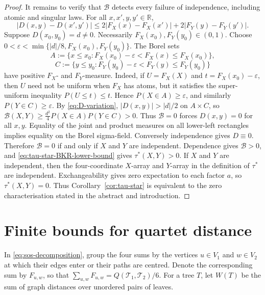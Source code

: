 \documentclass[12pt]{article}
\begin{document}
\begin{proof}
It remains to verify that $\mathcal B$ detects every failure of
independence, including atomic and singular laws.  For all
$x,x',y,y'\in\mathbb R$,
\begin{equation}\label{eq:D-variation}
|D(x,y)-D(x',y')|
\le2|F_X(x)-F_X(x')|+2|F_Y(y)-F_Y(y')|.
\end{equation}
Suppose $D(x_0,y_0)=d\ne0$.  Necessarily
$F_X(x_0),F_Y(y_0)\in(0,1)$.  Choose
$0<\varepsilon<\min\{|d|/8,\allowbreak F_X(x_0),\allowbreak F_Y(y_0)\}$.
The Borel sets
\begin{equation}\label{eq:display-099}
A:=\{x\le x_0:F_X(x_0)-\varepsilon<F_X(x)\le F_X(x_0)\},
\end{equation}
\begin{equation}\label{eq:display-100}
C:=\{y\le y_0:F_Y(y_0)-\varepsilon<F_Y(y)\le F_Y(y_0)\}
\end{equation}
have positive $F_X$- and $F_Y$-measure.  Indeed, if
$U=F_X(X)$ and $t=F_X(x_0)-\varepsilon$, then $U$ need not be uniform when
$F_X$ has atoms, but it satisfies the super-uniform inequality
$P(U\le t)\le t$.  Hence
$P(X\in A)\ge\varepsilon$, and similarly $P(Y\in C)\ge\varepsilon$.
By \eqref{eq:D-variation}, $|D(x,y)|>|d|/2$ on $A\times C$, so
$\mathcal B(X,Y)\ge\frac{d^2}{4}P(X\in A)P(Y\in C)>0$.
Thus $\mathcal B=0$ forces $D(x,y)=0$ for all $x,y$.  Equality of the
joint and product measures on all lower-left rectangles implies equality
on the Borel sigma-field.  Conversely independence gives $D\equiv0$.
Therefore $\mathcal B=0$ if and only if $X$ and $Y$ are independent.
Dependence gives $\mathcal B>0$, and
\eqref{eq:tau-star-BKR-lower-bound} gives $\tau^*(X,Y)>0$.
If $X$ and $Y$ are independent, then the four-coordinate
$X$-array and $Y$-array in the definition of $\tau^*$ are independent.
Exchangeability gives zero expectation to each factor $a$, so
$\tau^*(X,Y)=0$.  Thus Corollary~\ref{cor:tau-star} is equivalent to the
zero characterisation stated in the abstract and introduction.
\end{proof}

\section{Finite bounds for quartet distance}
\label{sec:shape-refinement}

In \eqref{eq:sos-decomposition}, group the four sums by the vertices
$u\in V_1$ and $w\in V_2$ at which their edges enter or their paths
are centred. Denote the corresponding sum by $F_{u,w}$, so that
$\sum_{u,w}F_{u,w}=Q(\mathcal T_1,\mathcal T_2)/6$. For a tree $T$,
let $W(T)$ be the sum of graph distances over unordered pairs of leaves.
\end{document}
